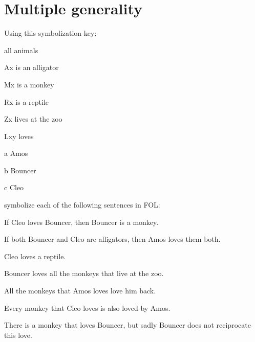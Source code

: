 \chapter{Multiple generality}\setcounter{ProbPart}{0}
\problempart
Using this symbolization key:
\begin{ekey}
\item[\text{domain}] all animals
\item[Ax]  is an alligator
\item[Mx]  is a monkey
\item[Rx]  is a reptile
\item[Zx]  lives at the zoo
\item[Lxy]  loves 
\item[a] Amos
\item[b] Bouncer
\item[c] Cleo
\end{ekey}
symbolize each of the following sentences in FOL:
\begin{earg}
\item If Cleo loves Bouncer, then Bouncer is a monkey. 
\item[] 
\item If both Bouncer and Cleo are alligators, then Amos loves them both.
\item[] 
\item Cleo loves a reptile.
\item[] 
\item Bouncer loves all the monkeys that live at the zoo.
\item[] \item All the monkeys that Amos loves love him back.
\item[] 
\item Every monkey that Cleo loves is also loved by Amos.
\item[] 
\item There is a monkey that loves Bouncer, but sadly Bouncer does not reciprocate this love.
\item[] 
\end{earg}

